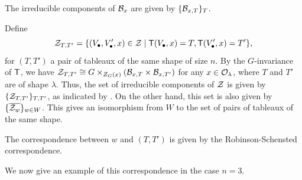 \begin{theorem}{}
    The irreducible components of $\mathcal{B}_x$ are given by $\{\mathcal{B}_{x, T}\}_T$.
\end{theorem}

Define
\begin{equation*}
    \mathcal{Z}_{T, T'} = \{ (V_\bullet, V'_\bullet, x) \in \mathcal{Z} \mid \mathsf{T}(V_\bullet, x) = T, \mathsf{T}(V'_\bullet, x) = T' \},
\end{equation*}
for $(T, T')$ a pair of tableaux of the same shape of size $n$. By the $G$-invariance of $\mathsf{T}$, we have $\mathcal{Z}_{T, T'} \cong G \times_{Z_G(x)} (\mathcal{B}_{x, T} \times \mathcal{B}_{x, T'})$ for any $x \in \mathcal{O}_\lambda$, where $T$ and $T'$ are of shape $\lambda$. Thus, the set of irreducible components of $\mathcal{Z}$ is given by $\{\mathcal{Z}_{T, T'}\}_{T, T'}$, as indicated by . On the other hand, this set is also given by $\{\overline{\mathcal{Z}_{w}}\}_{w \in W}$. This gives an isomorphism from $W$ to the set of pairs of tableaux of the same shape.

\begin{theorem}{}
    The correspondence between $w$ and $(T, T')$ is given by the Robinson-Schensted correspondence.
\end{theorem}

\iffalse
We now give an example of this correspondence in the case $n=3$.

